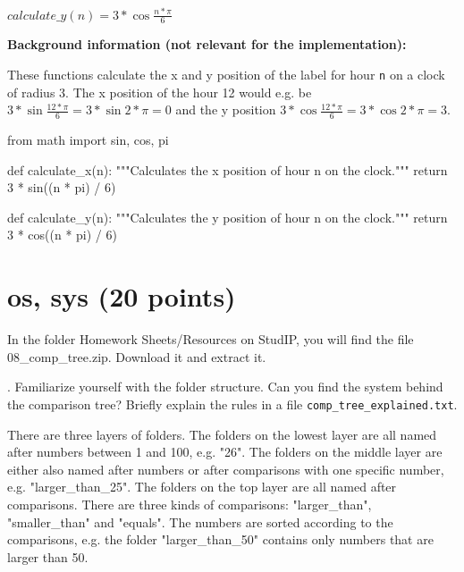 \noindent $calculate\_y(n) = 3 * \cos{\frac{n * \pi}{6}}$

\vspace{1em}

\noindent \textbf{Background information (not relevant for the implementation):} 

\vspace{1em}

\noindent These functions calculate the x and y position of the label for hour \texttt{n} on a clock of radius 3. The x position of the hour 12 would e.g. be $3 * \sin{\frac{12 * \pi}{6}} = 3 * \sin{2 * \pi} = 0$ and the y position $3 * \cos{\frac{12 * \pi}{6}} = 3 * \cos{2 * \pi} = 3$.

\vspace{1em}

\begin{solution}

\begin{pythoncode}

from math import sin, cos, pi

def calculate_x(n):
    """Calculates the x position of hour n on the clock."""
    return 3 * sin((n * pi) / 6)

def calculate_y(n):
    """Calculates the y position of hour n on the clock."""
    return 3 * cos((n * pi) / 6)

\end{pythoncode}

\end{solution}

\section{os, sys (20 points)}

In the folder Homework Sheets/Resources on StudIP, you will find the file 08\_comp\_tree.zip. Download it and extract it. 

\vspace{1em}

. Familiarize yourself with the folder structure. Can you find the system behind the comparison tree? Briefly explain the rules in a file \texttt{comp\_tree\_explained.txt}.

\vspace{1em}

\begin{solution}

\noindent There are three layers of folders. The folders on the lowest layer are all named after numbers between 1 and 100, e.g. "26". The folders on the middle layer are either also named after numbers or after comparisons with one specific number, e.g. "larger\_than\_25". The folders on the top layer are all named after comparisons. There are three kinds of comparisons: "larger\_than", "smaller\_than" and "equals". \newline The numbers are sorted according to the comparisons, e.g. the folder "larger\_than\_50" contains only numbers that are larger than 50.

\end{solution}

